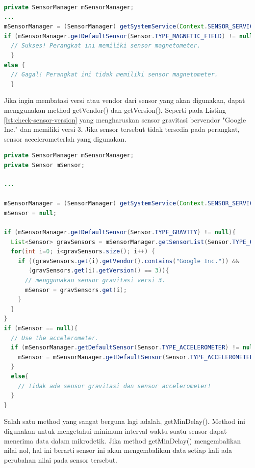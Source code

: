 \begin{lstlisting}[caption={Contoh untuk mengecek apakah perangkat yang digunakan memiliki sensor dengan jenis yang diberikan},label={lst:check-sensor},language=java]
private SensorManager mSensorManager;
...
mSensorManager = (SensorManager) getSystemService(Context.SENSOR_SERVICE);
if (mSensorManager.getDefaultSensor(Sensor.TYPE_MAGNETIC_FIELD) != null){
  // Sukses! Perangkat ini memiliki sensor magnetometer.
  }
else {
  // Gagal! Perangkat ini tidak memiliki sensor magnetometer.
  }
\end{lstlisting}

Jika ingin membatasi versi atau vendor dari sensor yang akan digunakan, dapat menggunakan method getVendor() dan getVersion(). Seperti pada Listing \ref{lst:check-sensor-version} yang mengharuskan sensor gravitasi bervendor "Google Inc." dan memiliki versi 3. Jika sensor tersebut tidak tersedia pada perangkat, sensor accelerometerlah yang digunakan.

\begin{lstlisting}[caption={Contoh untuk mengecek apakah perangkat yang digunakan memiliki sensor dengan jenis yang diberikan},label={lst:check-sensor-version},language=java]
private SensorManager mSensorManager;
private Sensor mSensor;

...

mSensorManager = (SensorManager) getSystemService(Context.SENSOR_SERVICE);
mSensor = null;

if (mSensorManager.getDefaultSensor(Sensor.TYPE_GRAVITY) != null){
  List<Sensor> gravSensors = mSensorManager.getSensorList(Sensor.TYPE_GRAVITY);
  for(int i=0; i<gravSensors.size(); i++) {
    if ((gravSensors.get(i).getVendor().contains("Google Inc.")) &&
       (gravSensors.get(i).getVersion() == 3)){
      // menggunakan sensor gravitasi versi 3.
      mSensor = gravSensors.get(i);
    }
  }
}
if (mSensor == null){
  // Use the accelerometer.
  if (mSensorManager.getDefaultSensor(Sensor.TYPE_ACCELEROMETER) != null){
    mSensor = mSensorManager.getDefaultSensor(Sensor.TYPE_ACCELEROMETER);
  }
  else{
    // Tidak ada sensor gravitasi dan sensor accelerometer!
  }
}
\end{lstlisting}

Salah satu method yang sangat berguna lagi adalah, getMinDelay(). Method ini digunakan untuk mengetahui minimum interval waktu suatu sensor dapat menerima data dalam mikrodetik. Jika method getMinDelay() mengembalikan nilai nol, hal ini berarti sensor ini akan mengembalikan data setiap kali ada perubahan nilai pada sensor tersebut. 

